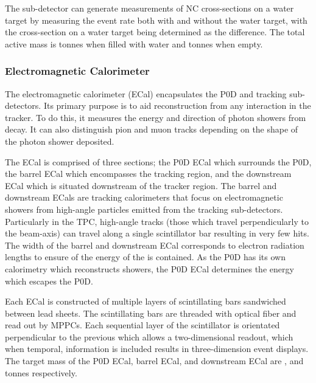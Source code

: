 The sub-detector can generate measurements of NC cross-sections on a water target by measuring the event rate both with and without the water target, with the cross-section on a water target being determined as the difference. The total active mass is  tonnes when filled with water and  tonnes when empty.

\subsubsection{Electromagnetic Calorimeter}
\label{subsubsec:T2KSKExp_T2K_ECAL}

The electromagnetic calorimeter \cite{Allan_2013} (ECal) encapsulates the P0D and tracking sub-detectors. Its primary purpose is to aid  reconstruction from any interaction in the tracker. To do this, it measures the energy and direction of photon showers from \quickmath{\pi^0 \rightarrow 2\gamma} decay. It can also distinguish pion and muon tracks depending on the shape of the photon shower deposited.

The ECal is comprised of three sections; the P0D ECal which surrounds the P0D, the barrel ECal which encompasses the tracking region, and the downstream ECal which is situated downstream of the tracker region. The barrel and downstream ECals are tracking calorimeters that focus on electromagnetic showers from high-angle particles emitted from the tracking sub-detectors. Particularly in  the TPC, high-angle tracks (those which travel perpendicularly to the beam-axis) can travel along a single scintillator bar resulting in very few hits. The width of the barrel and downstream ECal corresponds to  electron radiation lengths to ensure  of the energy of the  is contained. As the P0D has its own calorimetry which reconstructs showers, the P0D ECal determines the energy which escapes the P0D.

Each ECal is constructed of multiple layers of scintillating bars sandwiched between lead sheets. The scintillating bars are threaded with optical fiber and read out by MPPCs. Each sequential layer of the scintillator is orientated perpendicular to the previous which allows a two-dimensional readout, which when temporal, information is included results in three-dimension event displays. The target mass of the P0D ECal, barrel ECal, and downstream ECal are ,  and  tonnes respectively.

